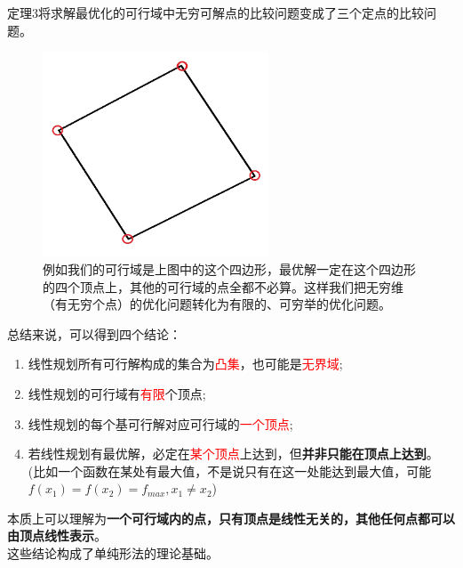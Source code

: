         定理3将求解最优化的可行域中无穷可解点的比较问题变成了三个定点的比较问题。
        \begin{figure}[H]
            \centering
            \includegraphics[width=0.6\textwidth]{4.png}
            \caption{例如我们的可行域是上图中的这个四边形，最优解一定在这个四边形的四个顶点上，其他的可行域的点全都不必算。这样我们把无穷维（有无穷个点）的优化问题转化为有限的、可穷举的优化问题。}
            \label{fig:Chapter2_Temporary_Pavilion_4}
        \end{figure}
        总结来说，可以得到四个结论：
        \begin{enumerate}
            \item 线性规划所有可行解构成的集合为\textcolor{red}{凸集}，也可能是\textcolor{red}{无界域};
            \item 线性规划的可行域有\textcolor{red}{有限}个顶点;
            \item 线性规划的每个基可行解对应可行域的\textcolor{red}{一个顶点};
            \item 若线性规划有最优解，必定在\textcolor{red}{某个顶点}上达到，但\textbf{并非只能在顶点上达到}。\\
            (比如一个函数在某处有最大值，不是说只有在这一处能达到最大值，可能$f(x_1)=f(x_2)=f_{max},x_1\neq x_2$)
        \end{enumerate}
        本质上可以理解为\textbf{一个可行域内的点，只有顶点是线性无关的，其他任何点都可以由顶点线性表示}。\\
        这些结论构成了单纯形法的理论基础。
